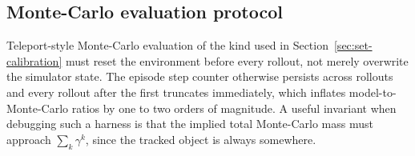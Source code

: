 \documentclass{article}
\begin{document}
\subsection{Monte-Carlo evaluation protocol}
\label{app:mc}

Teleport-style Monte-Carlo evaluation of the kind used in
Section~\ref{sec:set-calibration} must reset the environment before every rollout,
not merely overwrite the simulator state. The episode step counter otherwise
persists across rollouts and every rollout after the first truncates immediately,
which inflates model-to-Monte-Carlo ratios by one to two orders of magnitude. A
useful invariant when debugging such a harness is that the implied total
Monte-Carlo mass must approach $\sum_k\gamma^k$, since the tracked object is
always somewhere.
\end{document}
